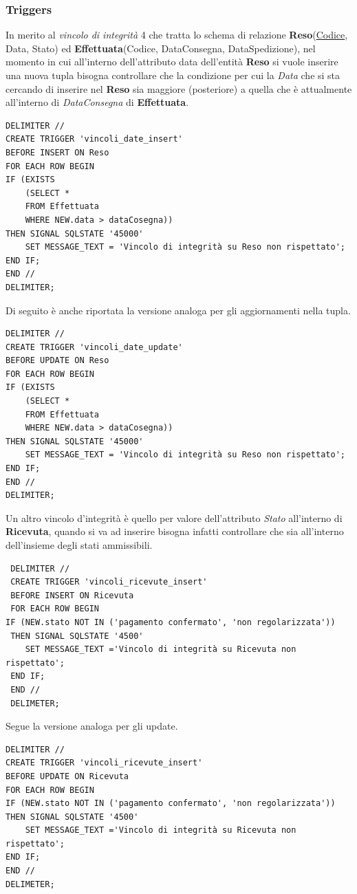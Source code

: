 \subsubsection*{Triggers}
In merito al \textit{vincolo di integrità} 4 che tratta lo schema di relazione \textbf{Reso}(\underline{Codice}, Data, Stato) ed \textbf{Effettuata}(Codice, DataConsegna, DataSpedizione), nel momento in cui all'interno dell'attributo data dell'entità \textbf{Reso} si vuole inserire una nuova tupla bisogna controllare che la condizione per cui la \textit{Data} che si sta cercando di inserire nel \textbf{Reso} sia maggiore (posteriore) a quella che è attualmente all'interno di \textit{DataConsegna }di \textbf{Effettuata}.
\begin{verbatim}
DELIMITER //
CREATE TRIGGER 'vincoli_date_insert'
BEFORE INSERT ON Reso
FOR EACH ROW BEGIN
IF (EXISTS 
	(SELECT *
	FROM Effettuata
	WHERE NEW.data > dataCosegna))
THEN SIGNAL SQLSTATE '45000'
	SET MESSAGE_TEXT = 'Vincolo di integrità su Reso non rispettato';
END IF;
END //
DELIMITER;
\end{verbatim}
Di seguito è anche riportata la versione analoga per gli aggiornamenti nella tupla.
\begin{verbatim}
DELIMITER //
CREATE TRIGGER 'vincoli_date_update' 
BEFORE UPDATE ON Reso
FOR EACH ROW BEGIN
IF (EXISTS 
	(SELECT *
	FROM Effettuata
	WHERE NEW.data > dataCosegna))
THEN SIGNAL SQLSTATE '45000'
	SET MESSAGE_TEXT = 'Vincolo di integrità su Reso non rispettato';
END IF;
END //
DELIMITER;
\end{verbatim}
 Un altro vincolo d'integrità è quello per valore dell'attributo \textit{Stato} all'interno di \textbf{Ricevuta}, quando si va ad inserire bisogna infatti controllare che sia all'interno dell'insieme degli stati ammissibili.
 \begin{verbatim}
 DELIMITER //
 CREATE TRIGGER 'vincoli_ricevute_insert'
 BEFORE INSERT ON Ricevuta
 FOR EACH ROW BEGIN 
IF (NEW.stato NOT IN ('pagamento confermato', 'non regolarizzata'))
 THEN SIGNAL SQLSTATE '4500'
 	SET MESSAGE_TEXT ='Vincolo di integrità su Ricevuta non rispettato';
 END IF;
 END //
 DELIMETER;
 \end{verbatim}
Segue la versione analoga per gli update.
\begin{verbatim}
DELIMITER //
CREATE TRIGGER 'vincoli_ricevute_insert'
BEFORE UPDATE ON Ricevuta
FOR EACH ROW BEGIN 
IF (NEW.stato NOT IN ('pagamento confermato', 'non regolarizzata'))
THEN SIGNAL SQLSTATE '4500'
	SET MESSAGE_TEXT ='Vincolo di integrità su Ricevuta non rispettato';
END IF;
END //
DELIMETER;
\end{verbatim}
